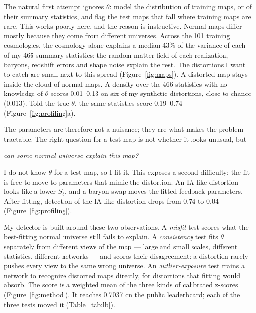 \documentclass[10pt]{article}
\begin{document}
The natural first attempt ignores $\theta$: model the distribution of training maps, or of their summary
statistics, and flag the test maps that fall where training maps are rare. This works poorly here, and the reason
is instructive. Normal maps differ mostly because they come from different universes. Across the 101 training
cosmologies, the cosmology alone explains a median 43\% of the variance of each of my 466 summary statistics;
the random matter field of each realization, baryons, redshift errors and shape noise explain the rest. The distortions I want to catch are small next to this
spread (Figure~\ref{fig:maps}). A distorted map stays inside the cloud of normal maps. A density over the 466
statistics with no knowledge of $\theta$ scores 0.01--0.13 on six of my synthetic distortions, close to chance
(0.013). Told the true $\theta$, the same statistics score 0.19--0.74 (Figure~\ref{fig:profiling}a).

The parameters are therefore not a nuisance; they are what makes the problem tractable. The right question for a
test map is not whether it looks unusual, but
\begin{center}
\emph{can some normal universe explain this map?}
\end{center}
I do not know $\theta$ for a test map, so I fit it. This exposes a second difficulty: the fit is free to move to
parameters that mimic the distortion. An IA-like distortion looks like a lower $S_8$, and a baryon swap moves the
fitted feedback parameters. After fitting, detection of the IA-like distortion drops from 0.74 to 0.04
(Figure~\ref{fig:profiling}).

My detector is built around these two observations. A \emph{misfit} test scores what the best-fitting normal
universe still fails to explain. A \emph{consistency} test fits $\theta$ separately from different views of the
map --- large and small scales, different statistics, different networks --- and scores their disagreement: a
distortion rarely pushes every view to the same wrong universe. An \emph{outlier-exposure} test trains a network to
recognize distorted maps directly, for distortions that fitting would absorb. The score is a weighted mean of the
three kinds of calibrated z-scores (Figure~\ref{fig:method}). It reaches 0.7037 on the public leaderboard; each of
the three tests moved it (Table~\ref{tab:lb}).
\end{document}

